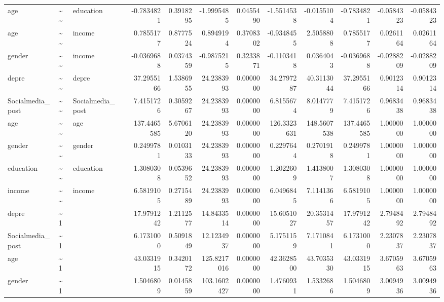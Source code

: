 \documentclass[
]{article}
\begin{document}
\begin{table}[!h]
\begin{tabular}[t]{llllrrrrrrrrr}
age & \textasciitilde{}\textasciitilde{} & education &  & -0.7834821 & 0.3918295 & -1.9995485 & 0.0455490 & -1.5514538 & -0.0155104 & -0.7834821 & -0.0584323 & -0.0584323\\
age & \textasciitilde{}\textasciitilde{} & income &  & 0.7855177 & 0.8777524 & 0.8949194 & 0.3708302 & -0.9348455 & 2.5058808 & 0.7855177 & 0.0261164 & 0.0261164\\
gender & \textasciitilde{}\textasciitilde{} & income &  & -0.0369688 & 0.0374359 & -0.9875215 & 0.3233871 & -0.1103418 & 0.0364043 & -0.0369688 & -0.0288209 & -0.0288209\\
\addlinespace
depre & \textasciitilde{}\textasciitilde{} & depre &  & 37.2955166 & 1.5386955 & 24.2383993 & 0.0000000 & 34.2797287 & 40.3113044 & 37.2955166 & 0.9012314 & 0.9012314\\
Socialmedia\_post & \textasciitilde{}\textasciitilde{} & Socialmedia\_post &  & 7.4151726 & 0.3059267 & 24.2383993 & 0.0000000 & 6.8155674 & 8.0147779 & 7.4151726 & 0.9683438 & 0.9683438\\
age & \textasciitilde{}\textasciitilde{} & age &  & 137.4465585 & 5.6706120 & 24.2383993 & 0.0000000 & 126.3323631 & 148.5607538 & 137.4465585 & 1.0000000 & 1.0000000\\
gender & \textasciitilde{}\textasciitilde{} & gender &  & 0.2499781 & 0.0103133 & 24.2383993 & 0.0000000 & 0.2297644 & 0.2701918 & 0.2499781 & 1.0000000 & 1.0000000\\
education & \textasciitilde{}\textasciitilde{} & education &  & 1.3080308 & 0.0539652 & 24.2383993 & 0.0000000 & 1.2022609 & 1.4138007 & 1.3080308 & 1.0000000 & 1.0000000\\
\addlinespace
income & \textasciitilde{}\textasciitilde{} & income &  & 6.5819105 & 0.2715489 & 24.2383993 & 0.0000000 & 6.0496845 & 7.1141366 & 6.5819105 & 1.0000000 & 1.0000000\\
depre & \textasciitilde{}1 &  &  & 17.9791242 & 1.2112577 & 14.8433514 & 0.0000000 & 15.6051027 & 20.3531457 & 17.9791242 & 2.7948492 & 2.7948492\\
Socialmedia\_post & \textasciitilde{}1 &  &  & 6.1731000 & 0.5091849 & 12.1234937 & 0.0000000 & 5.1751159 & 7.1710841 & 6.1731000 & 2.2307837 & 2.2307837\\
age & \textasciitilde{}1 &  &  & 43.0331915 & 0.3420172 & 125.8217016 & 0.0000000 & 42.3628500 & 43.7035330 & 43.0331915 & 3.6705963 & 3.6705963\\
gender & \textasciitilde{}1 &  &  & 1.5046809 & 0.0145859 & 103.1602427 & 0.0000000 & 1.4760931 & 1.5332686 & 1.5046809 & 3.0094936 & 3.0094936\\

\end{tabular}
\end{table}
\end{document}
